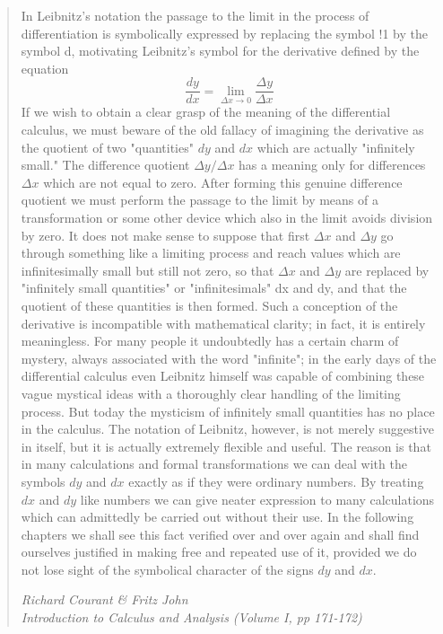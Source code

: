 \documentclass[11pt,a4paper]{article}
\begin{document}
\begin{quote}
	In Leibnitz's notation the passage to the limit in the process of
	differentiation is symbolically expressed by replacing the symbol !1
	by the symbol d, motivating Leibnitz's symbol for the derivative
	defined by the equation 
	\[\frac{dy}{dx} = \lim_{\Delta x \rightarrow 0} \frac{\Delta y}{\Delta x}\]
	If we wish to obtain a clear grasp of the meaning of the differential
	calculus, we must beware of the old fallacy of imagining the derivative
	as the quotient of two "quantities" $dy$ and $dx$ which are actually
	"infinitely small." The difference quotient $\Delta y/\Delta x$ has a meaning only
	for differences $\Delta x$ which are not equal to zero. After forming this
	genuine difference quotient we must perform the passage to the limit by
	means of a transformation or some other device which also in the limit
	avoids division by zero. It does not make sense to suppose that first
	$\Delta x$ and $\Delta y$ go through something like a limiting process and reach
	values which are infinitesimally small but still not zero, so that $\Delta x$ and
	$\Delta y$ are replaced by "infinitely small quantities" or "infinitesimals"
	dx and dy, and that the quotient of these quantities is then formed.
	Such a conception of the derivative is incompatible with mathematical
	clarity; in fact, it is entirely meaningless. For many people it undoubtedly has a certain charm of mystery, always associated with the
	word "infinite"; in the early days of the differential calculus even
	Leibnitz himself was capable of combining these vague mystical ideas 
	with a thoroughly clear handling of the limiting process. But today the
	mysticism of infinitely small quantities has no place in the calculus.
	The notation of Leibnitz, however, is not merely suggestive in itself,
	but it is actually extremely flexible and useful. The reason is that in
	many calculations and formal transformations we can deal with the
	symbols $dy$ and $dx$ exactly as if they were ordinary numbers. By
	treating $dx$ and $dy$ like numbers we can give neater expression to many
	calculations which can admittedly be carried out without their use. In
	the following chapters we shall see this fact verified over and over
	again and shall find ourselves justified in making free and repeated use
	of it, provided we do not lose sight of the symbolical character of the
	signs $dy$ and $dx$. 
	
	
	\textit{Richard Courant \& Fritz John \\ 
		Introduction to Calculus and Analysis (Volume I, pp 171-172)}
\end{quote}
\end{document}
